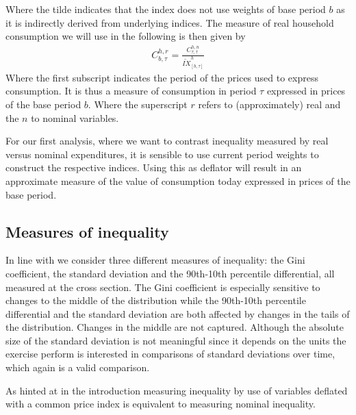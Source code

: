 \documentclass{article}
\begin{document}
Where the tilde indicates that the index does not use weights of base period $b$ as it is indirectly derived from underlying indices. 
The measure of real household consumption we will use in the following is then given by 
\begin{align}
    C^{h,r}_{b,\tau}= \frac{C^{h,n}_{\tau,\tau}}{\widetilde{IX}^h_{[b,\tau]}}
\end{align}
Where the first subscript indicates the period of the prices used to express consumption. It is thus a measure of consumption in period $\tau$ expressed in prices of the base period $b$. Where the superscript $r$ refers to (approximately) real and the $n$ to nominal variables.

For our first analysis, where we want to contrast inequality measured by real versus nominal expenditures, it is sensible to use current period weights to construct the respective indices. Using this as deflator will result in an approximate measure of the value of consumption today expressed in prices of the base period. 

\subsection{Measures of inequality} 
In line with \cite{Coibion2017InnocentInequality} we consider three different measures of inequality: the Gini coefficient, the standard deviation and the 90th-10th percentile differential, all measured at the cross section. 
The Gini coefficient is especially sensitive to changes to the middle of the distribution while the 90th-10th percentile differential and the standard deviation are both affected by changes in the tails of the distribution. Changes in the middle are not captured. Although the absolute size of the standard deviation is not meaningful since it depends on the units the exercise \cite{Coibion2017InnocentInequality} perform is interested in comparisons of standard deviations over time, which again is a valid comparison.

As hinted at in the introduction measuring inequality by use of variables deflated with a common price index is equivalent to measuring nominal inequality.
\end{document}
